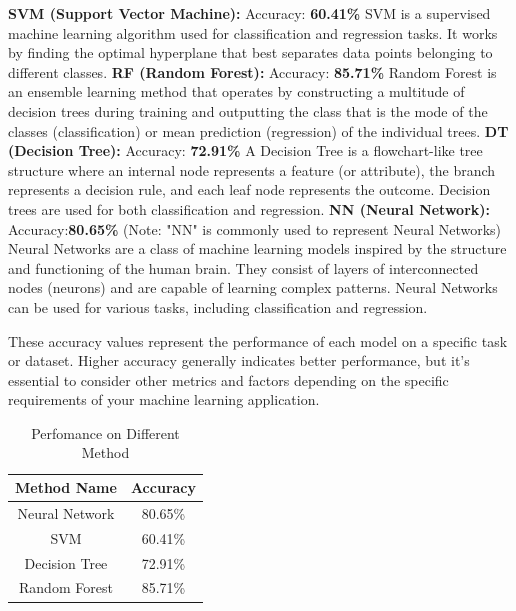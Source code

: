 \textbf{SVM (Support Vector Machine): }\newline
Accuracy: \textbf{60.41\%} SVM is a supervised machine learning algorithm used for classification and regression tasks. It works by finding the optimal hyperplane that best separates data points belonging to different classes. \newline
\textbf{RF (Random Forest):} \newline
Accuracy: \textbf{85.71\%} Random Forest is an ensemble learning method that operates by constructing a multitude of decision trees during training and outputting the class that is the mode of the classes (classification) or mean prediction (regression) of the individual trees. \newline
\textbf{DT (Decision Tree): }\newline
Accuracy:\textbf{ 72.91\%} A Decision Tree is a flowchart-like tree structure where an internal node represents a feature (or attribute), the branch represents a decision rule, and each leaf node represents the outcome. Decision trees are used for both classification and regression. \newline
\textbf{NN (Neural Network):} \newline
Accuracy:\textbf{80.65\%} (Note: "NN" is commonly used to represent Neural Networks) Neural Networks are a class of machine learning models inspired by the structure and functioning of the human brain. They consist of layers of interconnected nodes (neurons) and are capable of learning complex patterns. Neural Networks can be used for various tasks, including classification and regression. \newline

These accuracy values represent the performance of each model on a specific task or dataset. Higher accuracy generally indicates better performance, but it's essential to consider other metrics and factors depending on the specific requirements of your machine learning application. 


\begin{table}[!h]
    \centering
    \begin{tabular}{|c|c|} \hline 
         \textbf{Method Name}& \textbf{Accuracy}\\ \hline 
         Neural Network& 80.65\%
\\ \hline 
         SVM& 60.41\%
\\ \hline 
         Decision Tree
& 72.91\%
\\ \hline 
         Random Forest& 85.71\%
\\ \hline
    \end{tabular}
    \caption{Perfomance on Different Method}
    \label{tab:Evaluation Result}
\end{table}


